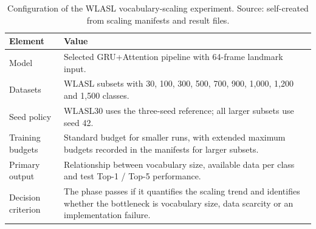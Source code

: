 \begin{table}[!htbp]
    \centering
    \small
    \renewcommand{\arraystretch}{1.25}
    \caption{Configuration of the WLASL vocabulary-scaling experiment. Source: self-created from scaling manifests and result files.}
    \label{tab:exp_scaling_config}
    \begin{tabularx}{\linewidth}{@{}>{\RaggedRight\arraybackslash}p{3.3cm} >{\RaggedRight\arraybackslash}X@{}}
        \toprule
        \textbf{Element}   & \textbf{Value}                                                                                                                                            \\
        \midrule
        Model              & Selected GRU+Attention pipeline with 64-frame landmark input.                                                                                             \\
        Datasets           & WLASL subsets with 30, 100, 300, 500, 700, 900, 1{,}000, 1{,}200 and 1{,}500 classes.                                                                     \\
        Seed policy        & WLASL30 uses the three-seed reference; all larger subsets use seed 42.                                                                                    \\
        Training budgets   & Standard budget for smaller runs, with extended maximum budgets recorded in the manifests for larger subsets.                                             \\
        Primary output     & Relationship between vocabulary size, available data per class and test Top-1 / Top-5 performance.                                                        \\
        Decision criterion & The phase passes if it quantifies the scaling trend and identifies whether the bottleneck is vocabulary size, data scarcity or an implementation failure. \\
        \bottomrule
    \end{tabularx}
\end{table}

